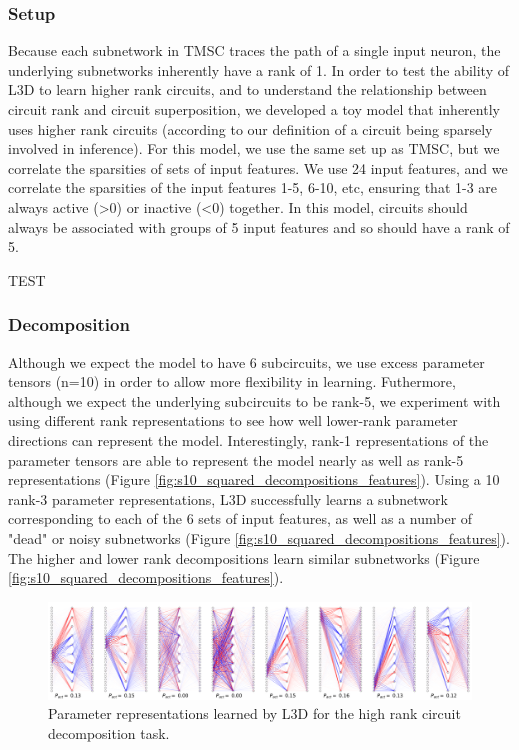 \documentclass{article}
\theoremstyle{plain}
\theoremstyle{definition}
\theoremstyle{remark}
\begin{document}
\subsubsection{Setup}
Because each subnetwork in TMSC traces the path of a single input neuron, the underlying subnetworks inherently have a rank of 1. In order to test the ability of L3D to learn higher rank circuits, and to understand the relationship between circuit rank and circuit superposition, we developed a toy model that inherently uses higher rank circuits (according to our definition of a circuit being sparsely involved in inference). For this model, we use the same set up as TMSC, but we correlate the sparsities of sets of input features. We use 24 input features, and we correlate the sparsities of the input features 1-5, 6-10, etc, ensuring that 1-3 are always active (>0) or inactive (<0) together. In this model, circuits should always be associated with groups of 5 input features and so should have a rank of 5.

TEST
\subsubsection{Decomposition}

Although we expect the model to have 6 subcircuits, we use excess parameter tensors (n=10) in order to allow more flexibility in learning. Futhermore, although we expect the underlying subcircuits to be rank-5, we experiment with using different rank representations to see how well lower-rank parameter directions can represent the model. Interestingly, rank-1 representations of the parameter tensors are able to represent the model nearly as well as rank-5 representations (Figure \ref{fig:s10_squared_decompositions_features}). Using a 10 rank-3 parameter representations, L3D successfully learns a subnetwork corresponding to each of the 6 sets of input features, as well as a number of "dead" or noisy subnetworks (Figure \ref{fig:s10_squared_decompositions_features}). The higher and lower rank decompositions learn similar subnetworks (Figure \ref{fig:s10_squared_decompositions_features}).



\begin{figure}[htbp]
    \centerline{\includegraphics[width=\textwidth]{../figures/7_high_rank_decomposition.pdf}}
    \centering
    \caption{Parameter representations learned by L3D for the high rank circuit decomposition task.}\label{fig:7_high_rank_decomposition}
\end{figure}
\end{document}
